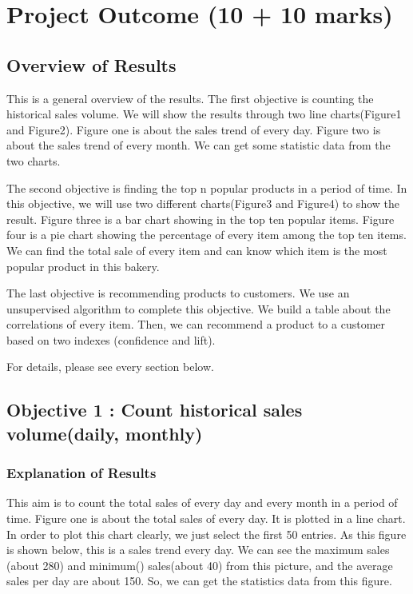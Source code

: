 \documentclass[11pt]{article}
\begin{document}
    
    \hypertarget{project-outcome-10-10-marks}{%
\section{Project Outcome (10 + 10
marks)}\label{project-outcome-10-10-marks}}

    \hypertarget{overview-of-results}{%
\subsection{Overview of Results}\label{overview-of-results}}

This is a general overview of the results. The first objective is
counting the historical sales volume. We will show the results through
two line charts(Figure1 and Figure2). Figure one is about the sales
trend of every day. Figure two is about the sales trend of every month.
We can get some statistic data from the two charts.

The second objective is finding the top n popular products in a period
of time. In this objective, we will use two different charts(Figure3 and
Figure4) to show the result. Figure three is a bar chart showing in the
top ten popular items. Figure four is a pie chart showing the percentage
of every item among the top ten items. We can find the total sale of
every item and can know which item is the most popular product in this
bakery.

The last objective is recommending products to customers. We use an
unsupervised algorithm to complete this objective. We build a table
about the correlations of every item. Then, we can recommend a product
to a customer based on two indexes (confidence and lift).

For details, please see every section below.

    \hypertarget{objective-1-count-historical-sales-volumedaily-monthly}{%
\subsection{Objective 1 : Count historical sales volume(daily,
monthly)}\label{objective-1-count-historical-sales-volumedaily-monthly}}

\hypertarget{explanation-of-results}{%
\subsubsection{Explanation of Results}\label{explanation-of-results}}

This aim is to count the total sales of every day and every month in a
period of time. Figure one is about the total sales of every day. It is
plotted in a line chart. In order to plot this chart clearly, we just
select the first 50 entries. As this figure is shown below, this is a
sales trend every day. We can see the maximum sales (about 280) and
minimum() sales(about 40) from this picture, and the average sales per
day are about 150. So, we can get the statistics data from this figure.
\end{document}

